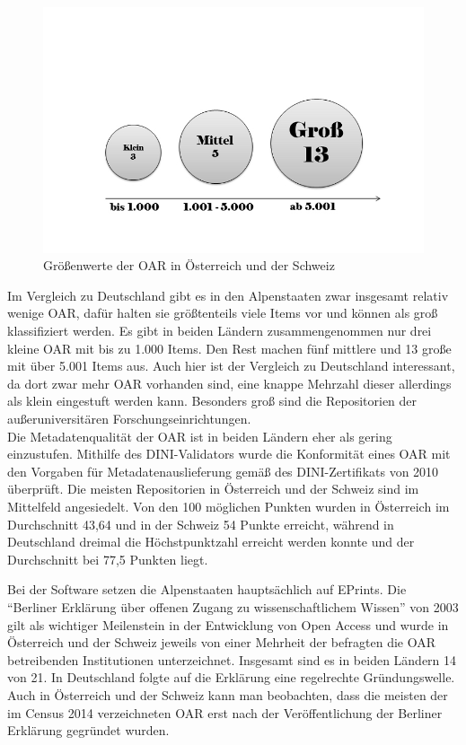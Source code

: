 \documentclass[a4paper,
fontsize=11pt,
oneside,
numbers=noperiodatend,
parskip=half-,
bibliography=totoc,
final
]{scrartcl}
\begin{document}
\begin{figure}[htbp]
\centering
\includegraphics{img/abb11_groesse_repos_at_ch.jpg}
\caption{Größenwerte der OAR in Österreich und der
Schweiz}
\end{figure}

Im Vergleich zu Deutschland gibt es in den Alpenstaaten zwar insgesamt
relativ wenige OAR, dafür halten sie größtenteils viele Items vor und
können als groß klassifiziert werden. Es gibt in beiden Ländern
zusammengenommen nur drei kleine OAR mit bis zu 1.000 Items. Den Rest
machen fünf mittlere und 13 große mit über 5.001 Items aus. Auch hier
ist der Vergleich zu Deutschland interessant, da dort zwar mehr OAR
vorhanden sind, eine knappe Mehrzahl dieser allerdings als klein
eingestuft werden kann. Besonders groß sind die Repositorien der
außeruniversitären Forschungseinrichtungen.\\
Die Metadatenqualität der OAR ist in beiden Ländern eher als gering
einzustufen. Mithilfe des DINI-Validators wurde die Konformität eines
OAR mit den Vorgaben für Metadatenauslieferung gemäß des
DINI-Zertifikats von 2010 überprüft. Die meisten Repositorien in
Österreich und der Schweiz sind im Mittelfeld angesiedelt. Von den 100
möglichen Punkten wurden in Österreich im Durchschnitt 43,64 und in der
Schweiz 54 Punkte erreicht, während in Deutschland dreimal die
Höchstpunktzahl erreicht werden konnte und der Durchschnitt bei 77,5
Punkten liegt.

Bei der Software setzen die Alpenstaaten hauptsächlich auf EPrints. Die
\enquote{Berliner Erklärung über offenen Zugang zu wissenschaftlichem
Wissen} von 2003 gilt als wichtiger Meilenstein in der Entwicklung von
Open Access und wurde in Österreich und der Schweiz jeweils von einer
Mehrheit der befragten die OAR betreibenden Institutionen unterzeichnet.
Insgesamt sind es in beiden Ländern 14 von 21. In Deutschland folgte auf
die Erklärung eine regelrechte Gründungswelle. Auch in Österreich und
der Schweiz kann man beobachten, dass die meisten der im Census 2014
verzeichneten OAR erst nach der Veröffentlichung der Berliner Erklärung
gegründet wurden.
\end{document}

